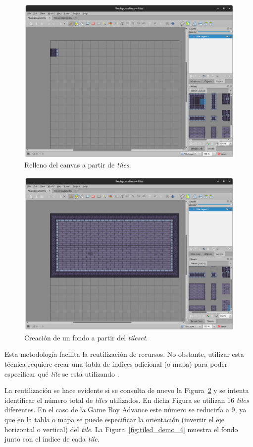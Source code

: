 \begin{figure}[h]
	\centering
	\includegraphics[width=.6\textwidth]{capitulos/capitulo3/tiled_demo_2.png}
	\caption{Relleno del canvas a partir de \textit{tiles}.}
	\label{fig:tiled_demo_2}
\end{figure}

\begin{figure}[h]
	\centering
	\includegraphics[width=.6\textwidth]{capitulos/capitulo3/tiled_demo_3.png}
	\caption{Creación de un fondo a partir del \textit{tileset}.}
	\label{fig:tiled_demo_3}
\end{figure}
\FloatBarrier

Esta metodología facilita la reutilización de recursos. No obstante, utilizar esta técnica requiere crear una tabla de índices adicional (o mapa) para poder especificar qué \textit{tile} se está utilizando \cite{bib:tonc}.

La reutilización se hace evidente si se consulta de nuevo la Figura~\ref{fig:tiled_demo_3} y se intenta identificar el número total de \textit{tiles} utilizados. En dicha Figura se utilizan 16 \textit{tiles} diferentes. En el caso de la Game Boy Advance este número se reduciría a 9, ya que en la tabla o mapa se puede especificar la orientación (invertir el eje horizontal o vertical) del \textit{tile}. La Figura~\ref{fig:tiled_demo_4} muestra el fondo junto con el índice de cada \textit{tile}.

